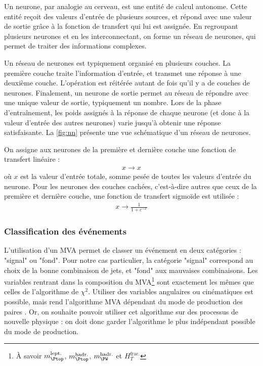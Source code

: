 Un neurone, par analogie au cerveau, est une entité de calcul autonome. Cette entité reçoit des valeurs d'entrée de plusieurs sources, et répond avec une valeur de sortie grâce à la fonction de transfert qui lui est assignée. En regroupant plusieurs neurones et en les interconnectant, on forme un réseau de neurones, qui permet de traiter des informations complexes.

Un réseau de neurones est typiquement organisé en plusieurs couches. La première couche traite l'information d'entrée, et transmet une réponse à une deuxième couche. L'opération est réitérée autant de fois qu'il y a de couches de neurones. Finalement, un neurone de sortie permet au réseau de répondre avec une unique valeur de sortie, typiquement un nombre. Lors de la phase d'entraînement, les poids assignés à la réponse de chaque neurone (et donc à la valeur d'entrée des autres neurones) varie jusqu'à obtenir une réponse satisfaisante. La \cref{fig:nn} présente une vue schématique d'un réseau de neurones.

On assigne aux neurones de la première et dernière couche une fonction de transfert linéaire :
\begin{align*}
  x \rightarrow x
\end{align*}
où $x$ est la valeur d'entrée totale, somme pesée de toutes les valeurs d'entrée du neurone. Pour les neurones des couches cachées, c'est-à-dire autres que ceux de la première et dernière couche, une fonction de transfert sigmoïde est utilisée :
\begin{align*}
  x \rightarrow \frac{1}{1 + e^{-x}}
\end{align*}

\subsubsection{Classification des événements \ttbar}

L'utilisation d'un MVA permet de classer un événement en deux catégories : "signal" ou "fond". Pour notre cas particulier, la catégorie "signal" correspond au choix de la bonne combinaison de jets, et "fond" aux mauvaises combinaisons. Les variables rentrant dans la composition du MVA\footnote{À savoir $m_{\Ptop}^{\text{lept.}}$, $m_{\Ptop}^{\text{hadr.}}$, $m_{\PW}^{\text{hadr.}}$ et $H_{T}^{\text{frac.}}$} sont exactement les mêmes que celles de l'algorithme de $\chi^2$. Utiliser des variables angulaires ou cinématiques est possible, mais rend l'algorithme MVA dépendant du mode de production des paires \ttbar. Or, on souhaite pouvoir utiliser cet algorithme sur des processus de nouvelle physique : on doit donc garder l'algorithme le plus indépendant possible du mode de production.

